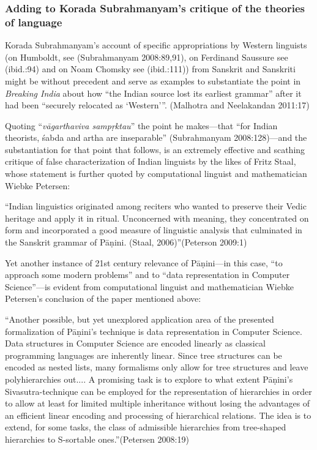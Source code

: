 \subsubsection{Adding to Korada Subrahmanyam’s critique of the theories of language}

Korada Subrahmanyam’s account of specific appropriations by Western linguists (on Humboldt, see (Subrahmanyam 2008:89,91), on Ferdinand Saussure see (ibid.:94) and on Noam Chomsky see (ibid.:111)) from Sanskrit and Sanskriti might be without precedent and serve as examples to substantiate the point in \textit{Breaking India} about how “the Indian source lost its earliest grammar” after it had been “securely relocated as ‘Western’”. (Malhotra and Neelakandan 2011:17)

Quoting “\textit{vāgarthaviva sampṛktau}” the point he makes—that “for Indian theorists, śabda and artha are inseparable” (Subrahmanyam 2008:128)—and the substantiation for that point that follows, is an extremely effective and scathing critique of false characterization of Indian linguists by the likes of Fritz Staal, whose statement is further quoted by computational linguist and mathematician Wiebke Petersen:

\begin{myquote}
“Indian linguistics originated among reciters who wanted to preserve their Vedic heritage and apply it in ritual. Unconcerned with meaning, they concentrated on form and incorporated a good measure of linguistic analysis that culminated in the Sanskrit grammar of Pāṇini. (Staal, 2006)”\hfill (Peterson 2009:1)
\end{myquote}

Yet another instance of 21st century relevance of Pāṇini—in this case, “to approach some modern problems” and to “data representation in Computer Science”—is evident from computational linguist and mathematician Wiebke Petersen’s conclusion of the paper mentioned above:

\begin{myquote}
“Another possible, but yet unexplored application area of the presented formalization of Pāṇini’s technique is data representation in Computer Science. Data structures in Computer Science are encoded linearly as classical programming languages are inherently linear. Since tree structures can be encoded as nested lists, many formalisms only allow for tree structures and leave polyhierarchies out.... A promising task is to explore to what extent Pāṇini’s Sivasutra-technique can be employed for the representation of hierarchies in order to allow at least for limited multiple inheritance without losing the advantages of an efficient linear encoding and processing of hierarchical relations. The idea is to extend, for some tasks, the class of admissible hierarchies from tree-shaped hierarchies to S-sortable ones.”\hfill (Petersen 2008:19)
\end{myquote}


